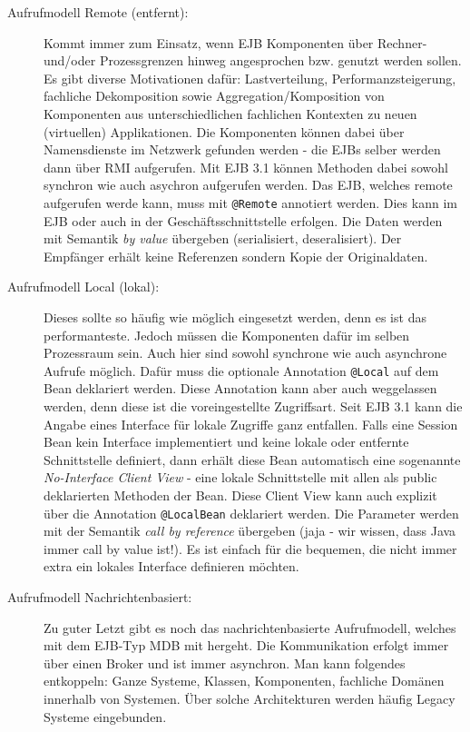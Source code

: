 \begin{description}
	\item[Aufrufmodell Remote (entfernt):] Kommt immer zum Einsatz, wenn EJB Komponenten über Rechner- und/oder Prozessgrenzen hinweg angesprochen bzw. genutzt werden sollen. Es gibt diverse Motivationen dafür: Lastverteilung, Performanzsteigerung, fachliche Dekomposition sowie Aggregation/Komposition von Komponenten aus unterschiedlichen fachlichen Kontexten zu neuen (virtuellen) Applikationen. Die Komponenten können dabei über Namensdienste im Netzwerk gefunden werden - die EJBs selber werden dann über RMI aufgerufen. Mit EJB 3.1 können Methoden dabei sowohl synchron wie auch asychron aufgerufen werden. Das EJB, welches remote aufgerufen werde kann, muss mit \verb|@Remote| annotiert werden. Dies kann im EJB oder auch in der Geschäftsschnittstelle erfolgen. Die Daten werden mit Semantik \emph{by value} übergeben (serialisiert, deseralisiert). Der Empfänger erhält keine Referenzen sondern Kopie der Originaldaten.
	
	\item[Aufrufmodell Local (lokal):] Dieses sollte so häufig wie möglich eingesetzt werden, denn es ist das performanteste. Jedoch müssen die Komponenten dafür im selben Prozessraum sein. Auch hier sind sowohl synchrone wie auch asynchrone Aufrufe möglich. Dafür muss die optionale Annotation \verb|@Local| auf dem Bean deklariert werden. Diese Annotation kann aber auch weggelassen werden, denn diese ist die voreingestellte Zugriffsart.
	Seit EJB 3.1 kann die Angabe eines Interface für lokale Zugriffe ganz entfallen. Falls eine Session Bean kein Interface implementiert und keine lokale oder entfernte Schnittstelle definiert, dann erhält diese Bean automatisch eine sogenannte \emph{No-Interface Client View} - eine lokale Schnittstelle mit allen als public deklarierten Methoden der Bean. Diese Client View kann auch explizit über die Annotation \verb|@LocalBean| deklariert werden. Die Parameter werden mit der Semantik \emph{call by reference} übergeben (jaja - wir wissen, dass Java immer call by value ist!). Es ist einfach für die bequemen, die nicht immer extra ein lokales Interface definieren möchten.
	
	\item[Aufrufmodell Nachrichtenbasiert:] Zu guter Letzt gibt es noch das nachrichtenbasierte Aufrufmodell, welches mit dem EJB-Typ MDB mit hergeht. Die Kommunikation erfolgt immer über einen Broker und ist immer asynchron. Man kann folgendes entkoppeln: Ganze Systeme, Klassen, Komponenten, fachliche Domänen innerhalb von Systemen. Über solche Architekturen werden häufig Legacy Systeme eingebunden.
\end{description}

